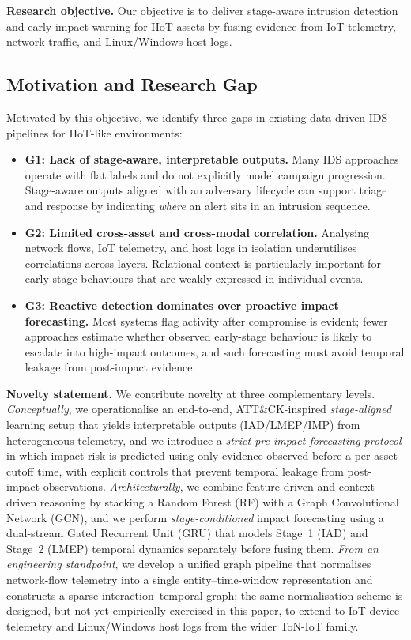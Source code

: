 \documentclass[pdflatex,sn-mathphys-num]{sn-jnl}
\theoremstyle{thmstyleone}%
\theoremstyle{thmstyletwo}%
\theoremstyle{thmstylethree}%
\begin{document}
\textbf{Research objective.}
Our objective is to deliver stage-aware intrusion detection and early impact warning for IIoT assets by fusing evidence from IoT telemetry, network traffic, and Linux/Windows host logs.


\subsection{Motivation and Research Gap}
Motivated by this objective, we identify three gaps in existing data-driven IDS pipelines for IIoT-like environments:
\begin{itemize}
    \item \textbf{G1: Lack of stage-aware, interpretable outputs.} Many IDS approaches operate with flat labels and do not explicitly model campaign progression. Stage-aware outputs aligned with an adversary lifecycle can support triage and response by indicating \emph{where} an alert sits in an intrusion sequence.
    \item \textbf{G2: Limited cross-asset and cross-modal correlation.} Analysing network flows, IoT telemetry, and host logs in isolation underutilises correlations across layers. Relational context is particularly important for early-stage behaviours that are weakly expressed in individual events.
    \item \textbf{G3: Reactive detection dominates over proactive impact forecasting.} Most systems flag activity after compromise is evident; fewer approaches estimate whether observed early-stage behaviour is likely to escalate into high-impact outcomes, and such forecasting must avoid temporal leakage from post-impact evidence.
\end{itemize}

\textbf{Novelty statement.}
We contribute novelty at three complementary levels. \emph{Conceptually}, we operationalise an end-to-end, ATT\&CK-inspired \emph{stage-aligned} learning setup that yields interpretable outputs (IAD/LMEP/IMP) from heterogeneous telemetry, and we introduce a \emph{strict pre-impact forecasting protocol} in which impact risk is predicted using only evidence observed before a per-asset cutoff time, with explicit controls that prevent temporal leakage from post-impact observations. \emph{Architecturally}, we combine feature-driven and context-driven reasoning by stacking a Random Forest (RF) with a Graph Convolutional Network (GCN), and we perform \emph{stage-conditioned} impact forecasting using a dual-stream Gated Recurrent Unit (GRU) that models Stage~1 (IAD) and Stage~2 (LMEP) temporal dynamics separately before fusing them. \emph{From an engineering standpoint}, we develop a unified graph pipeline that normalises network-flow telemetry into a single entity--time-window representation and constructs a sparse interaction--temporal graph; the same normalisation scheme is designed, but not yet empirically exercised in this paper, to extend to IoT device telemetry and Linux/Windows host logs from the wider ToN-IoT family.
\end{document}
